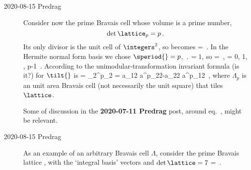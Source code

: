 \begin{description}
	\item[2020-08-15 Predrag]
Consider now the prime Bravais cell whose volume is a prime number,
\[
  \det\lattice_p = p
\,.
\]
Its only divisor is the unit cell of $\integers^2$, so
 becomes
\beq
\left[\begin{array}{cc}
k & m \\
l & n
\end{array}\right]
=
\left[\begin{array}{cc}
a_{11} & a_{12} \\
a_{21} & a_{22}
\end{array}\right]
\,.
\label{unitLambda_p}
\eeq
In the Hermite normal form basis 
we chose $\speriod{}=p$, $\period{}=1$, so
\beq
\left[\begin{array}{cc}
k & m \\
l & n
\end{array}\right]
=
    \,,\quad
\tilt{} = 0, 1, \cdots, p-1
\,.
\label{unitLambda_p}
\eeq
According to  the unimodular-transformation
invariant formula (is it?) for $\tilt{}$ is
\beq
\tilt{} = _2\times{}^p_2
         = a_{12} a^p_{22}-a_{22} a^p_{12}
\,,
where $\Lambda_p$ is an unit area Bravais cell (not necessarily the unit
square) that tiles $\lattice$.

Some of discussion in the {\bf 2020-07-11 Predrag} post,
around eq.~, might be relevant.

	\item[2020-08-15 Predrag]
As an example of an arbitrary Bravais cell $\Lambda$, consider
the prime Bravais lattice
, with the `integral basis' vectors 
and $\det\lattice=7$
\beq
\left[\begin{array}{cc}
a_{11} & a_{12} \\
a_{21} & a_{22}
\end{array}\right]
=
\left[\begin{array}{cc}
3 & 2 \\
1 & 3
\end{array}\right]
\,.
\label{unitLambda_p}
\eeq


\end{description}
